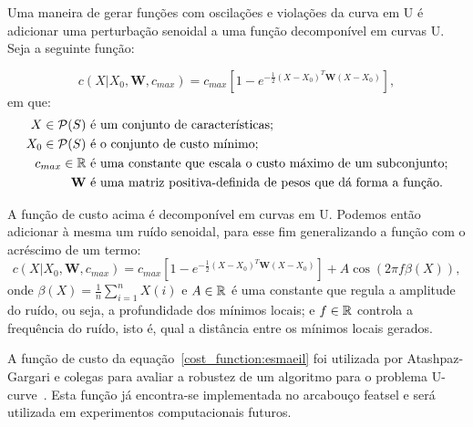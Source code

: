 Uma maneira de gerar funções com oscilações e violações da curva em U
é adicionar uma perturbação senoidal a uma função decomponível em curvas
U. Seja a seguinte função:

\begin{equation*} 
    c(X | X_0, {\mathbf W}, c_{max}) = c_{max} [1 - e^{- \frac{1}{2} (X - X_0)^T {\mathbf W} (X - X_0)}],
\end{equation*}
em que:
\begin{align*}
    X \in \mathcal{P}(S) & \text{ é um conjunto de características;} \\
    X_0 \in \mathcal{P} (S) & \text{ é o conjunto de custo mínimo;} \\
    c_{max} \in \mathbb{R} & \text{ é uma constante que escala o custo máximo de um subconjunto;} \\
    {\mathbf W} & \text { é uma matriz positiva-definida de pesos que dá forma a função.}
\end{align*}

A função de custo acima é decomponível em curvas em U. Podemos então adicionar à mesma um ruído senoidal, para esse fim generalizando a função com o acréscimo de um termo:
\begin{equation} \label{cost_function:esmaeil}
    c(X | X_0, {\mathbf W}, c_{max}) = c_{max} [1 - e^{- \frac{1}{2} (X - X_0)^T {\mathbf W} (X - X_0)}]  + A \cos (2\pi f \beta (X)),
\end{equation}
onde  $\beta (X) = \frac{1}{n} \sum_{i = 1}^{n} X (i)$ e $A \in \mathbb{R}$ é uma constante que regula a amplitude do ruído, 
ou seja, a profundidade dos mínimos locais; e $f \in \mathbb{R}$ controla a
frequência do ruído, isto é, qual a distância entre os mínimos locais 
gerados.

A função de custo da equação~\ref{cost_function:esmaeil} foi utilizada por Atashpaz-Gargari e colegas para avaliar a robustez de um algoritmo para o problema U-curve~\cite{AG+18}. Esta função já encontra-se implementada no arcabouço featsel e será utilizada em experimentos computacionais futuros.



